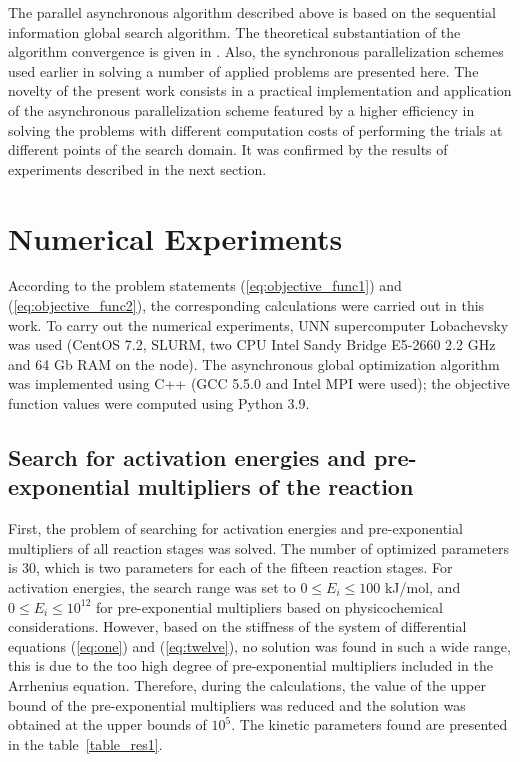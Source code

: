 \documentclass{svproc}
\begin{document}
The parallel asynchronous algorithm described above is based on the sequential information global search algorithm. The theoretical substantiation of the algorithm convergence is given in \cite{Strongin2000}. Also, the synchronous parallelization schemes used earlier in solving a number of applied problems \cite{Kalyulin2017,Modorskii2016} are presented here.
The novelty of the present work consists in a practical implementation and application of the asynchronous parallelization scheme featured by a higher efficiency in solving the problems with different computation costs of performing the trials at different points of the search domain. 
It was confirmed by the results of experiments described in the next section.

\section{Numerical Experiments}\label{Sec_Exp}

According to the problem statements (\ref{eq:objective_func1}) and (\ref{eq:objective_func2}), the corresponding calculations were carried out in this work.
To carry out the numerical experiments, UNN supercomputer Lobachevsky was used (CentOS 7.2, SLURM, two CPU Intel Sandy Bridge E5-2660 2.2 GHz and 64 Gb RAM on the node). The asynchronous global optimization algorithm was implemented using C++ (GCC 5.5.0 and Intel MPI were used); the objective function values were computed using Python 3.9.

\subsection{Search for activation energies and pre-exponential multipliers of the reaction}

First, the problem of searching for activation energies and pre-exponential multipliers of all reaction stages was solved. The number of optimized parameters is 30, which is two parameters for each of the fifteen reaction stages. For activation energies, the search range was set to $0 \leq E_i \leq 100$ kJ/mol, and $0 \leq E_i \leq 10^{12}$ for pre-exponential multipliers based on physicochemical considerations. However, based on the stiffness of the system of differential equations (\ref{eq:one}) and (\ref{eq:twelve}), no solution was found in such a wide range, this is due to the too high degree of pre-exponential multipliers included in the Arrhenius equation. Therefore, during the calculations, the value of the upper bound of the pre-exponential multipliers was reduced and the solution was obtained at the upper bounds of $10^5$. The kinetic parameters found are presented in the table~\ref{table_res1}.
\end{document}
